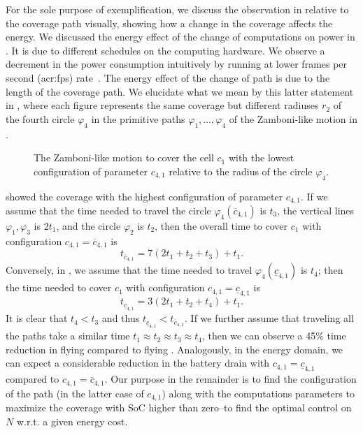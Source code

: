 For the sole purpose of exemplification, we discuss the observation in  relative to the coverage path visually, showing how a change in the coverage affects the energy. We discussed the energy effect of the change of computations on power in . It is due to different schedules on the computing hardware. We observe a decrement in the power consumption intuitively by running at lower frames per second (\Gls{acr:fps}) rate~\citep{seewald2019coarse,seewald2020mechanical,zamanakos2020energy}. The energy effect of the change of path is due to the length of the coverage path. We elucidate what we mean by this latter statement in , where each figure represents the same coverage but different radiuses $r_2$ of the fourth circle $\varphi_4$ in the primitive paths $\varphi_1,\dots,\varphi_4$ of the Zamboni-like motion in . 
\begin{figure}[h]
  \centering
  \selectfont
  
  \caption[The Zamboni-like motion with the lowest parameter configuration.]{The Zamboni-like motion to cover the cell $c_1$ with the lowest configuration of parameter $c_{4,1}$ relative to the radius of the circle $\varphi_4$.}
  \label{fig:zambo2}
\end{figure}
 showed the coverage with the highest configuration of parameter $c_{4,1}$. If we assume that the time needed to travel the circle $\varphi_4(\overline{c}_{4,1})$ is $t_3$, the vertical lines $\varphi_1,\varphi_3$ is $2t_1$, and the circle $\varphi_2$ is $t_2$, then the overall time to cover $c_1$ with configuration ${c}_{4,1}=\overline{c}_{4,1}$ is
\begin{equation}
  t_{\overline{c}_{4,1}}=7(2t_1+t_2+t_3)+t_1.  
\end{equation}
Conversely, in , we assume that the time needed to travel $\varphi_4(\underline{c}_{4,1})$ is $t_4$; then the time needed to cover $c_1$ with configuration ${c}_{4,1}=\underline{c}_{4,1}$ is 
\begin{equation}
t_{\underline{c}_{4,1}}=3(2t_1+t_2+t_4)+t_1. 
\end{equation}
It is clear that $t_4<t_3$ and thus $t_{\underline{c}_{4,1}}<t_{\overline{c}_{4,1}}$. If we further assume that traveling all the paths take a similar time $t_1\approx t_2\approx t_3\approx t_4$, then we can observe a 45\% time reduction in flying  compared to flying . Analogously, in the energy domain, we can expect a considerable reduction in the battery drain with ${c}_{4,1}=\underline{c}_{4,1}$ compared to ${c}_{4,1}=\overline{c}_{4,1}$. Our purpose in the remainder is to find the configuration of the path (in the latter case of $c_{4,1}$) along with the computations parameters to maximize the coverage with SoC higher than zero--to find the optimal control on $N$ w.r.t. a given energy cost.

